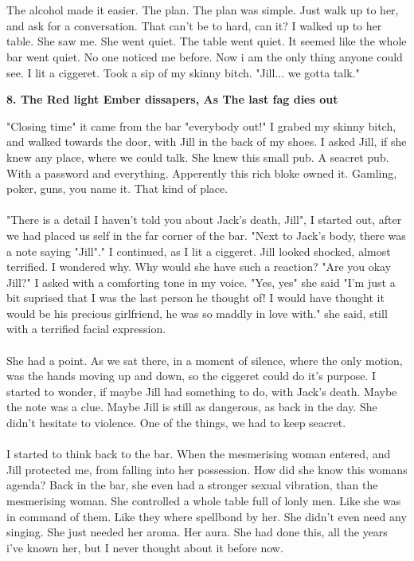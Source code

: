 \documentclass[]{article}
\begin{document}
\\ \\
The alcohol made it easier. The plan. The plan was simple. Just walk up to her, and ask for a conversation. That can't be to hard, can it? I walked up to her table. She saw me. She went quiet. The table went quiet. It seemed like the whole bar went quiet. No one noticed me before. Now i am the only thing anyone could see. I lit a ciggeret. Took a sip of my skinny bitch. "Jill... we gotta talk."

\newpage

\begin{center}
	\large\textbf{8. The Red light Ember dissapers, \newline As The last fag dies out}
\end{center}

"Closing time" it came from the bar "everybody out!" I grabed my skinny bitch, and walked towards the door, with Jill in the back of my shoes. I asked Jill, if she knew any place, where we could talk. She knew this small pub. A seacret pub. With a password and everything. Apperently this rich bloke owned it. Gamling, poker, guns, you name it. That kind of place. 
\\ \\
"There is a detail I haven't told you about Jack's death, Jill", I started out, after we had placed us self in the far corner of the bar. "Next to Jack's body, there was a note saying "Jill"." I continued, as I lit a ciggeret. Jill looked shocked, almost terrified. I wondered why. Why would she have such a reaction? "Are you okay Jill?" I asked with a comforting tone in my voice. "Yes, yes" she said "I'm just a bit suprised that I was the last person he thought of! I would have thought it would be his precious girlfriend, he was so maddly in love with." she said, still with a terrified facial expression.
\\ \\
She had a point. As we sat there, in a moment of silence, where the only motion, was the hands moving up and down, so the ciggeret could do it's purpose. I started to wonder, if maybe Jill had something to do, with Jack's death. Maybe the note was a clue. Maybe Jill is still as dangerous, as back in the day. She didn't hesitate to violence. One of the things, we had to keep seacret.
\\ \\
I started to think back to the bar. When the mesmerising woman entered, and Jill protected me, from falling into her possession. How did she know this womans agenda? Back in the bar, she even had a stronger sexual vibration, than the mesmerising woman. She controlled a whole table full of lonly men. Like she was in command of them. Like they where spellbond by her. She didn't even need any singing. She just needed her aroma. Her aura. She had done this, all the years i've known her, but I never thought about it before now.
\end{document}
